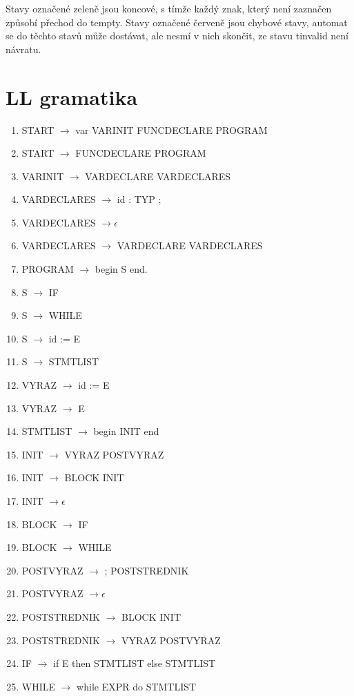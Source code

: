 \documentclass[a4paper]{article}
\begin{document}
Stavy označené zeleně jsou koncové, s tímže každý znak, který není zaznačen způsobí přechod do t\textunderscore empty.
Stavy označené červeně jsou chybové stavy, automat se do těchto stavů může dostávat, ale nesmí v nich skončit, ze stavu t\textunderscore invalid není návratu.
\clearpage

\newpage
\section{LL gramatika}
\begin{enumerate}
\item{START $\rightarrow $ var VARINIT FUNCDECLARE PROGRAM}
\item{START $\rightarrow $ FUNCDECLARE PROGRAM}
\item{VARINIT $\rightarrow $ VARDECLARE VARDECLARES } 
\item{VARDECLARES $\rightarrow $ id : TYP ; } 
\item{VARDECLARES $\rightarrow \epsilon$ } 
\item{VARDECLARES $\rightarrow$ VARDECLARE VARDECLARES } 
\item{PROGRAM $\rightarrow$ begin S end. } 
\item{S $\rightarrow$ IF } 
\item{S $\rightarrow$ WHILE } 
\item{S $\rightarrow$ id := E } 
\item{S $\rightarrow$ STMTLIST } 
\item{VYRAZ $\rightarrow$ id := E } 
\item{VYRAZ $\rightarrow$ E } 
\item{STMTLIST $\rightarrow$ begin INIT end } 
\item{INIT $\rightarrow$ VYRAZ POSTVYRAZ } 
\item{INIT $\rightarrow$ BLOCK INIT } 
\item{INIT $\rightarrow \epsilon$ } 
\item{BLOCK $\rightarrow$ IF } 
\item{BLOCK $\rightarrow$ WHILE }  
\item{POSTVYRAZ $\rightarrow$ ; POSTSTREDNIK } 
\item{POSTVYRAZ $\rightarrow \epsilon$  } 
\item{POSTSTREDNIK $\rightarrow$ BLOCK INIT } 
\item{POSTSTREDNIK $\rightarrow$ VYRAZ POSTVYRAZ } 
\item{IF $\rightarrow$ if E then STMTLIST else STMTLIST } 
\item{WHILE $\rightarrow$ while EXPR do STMTLIST } 

\end{enumerate}
\end{document}
